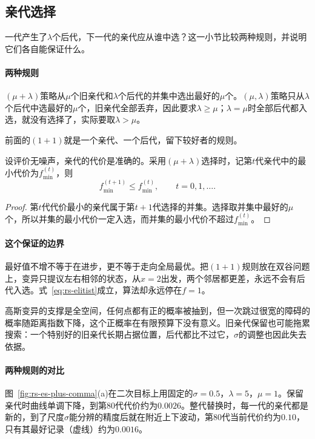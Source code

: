 \subsection{亲代选择}
\label{sec:rs-es-selection}

一代产生了$\lambda$个后代，下一代的亲代应从谁中选？这一小节比较两种规则，并说明它们各自能保证什么。

\paragraph{两种规则}
$(\mu+\lambda)$策略从$\mu$个旧亲代和$\lambda$个后代的并集中选出最好的$\mu$个。$(\mu,\lambda)$策略只从$\lambda$个后代中选最好的$\mu$个，旧亲代全部丢弃，因此要求$\lambda\geq\mu$；$\lambda=\mu$时全部后代都入选，就没有选择了，实际要取$\lambda>\mu$。

前面的$(1+1)$就是一个亲代、一个后代，留下较好者的规则。

\begin{theorem}[保留亲代时最好值不增]
\label{thm:rs-elitist}
设评价无噪声，亲代的代价是准确的。采用$(\mu+\lambda)$选择时，记第$t$代亲代中的最小代价为$f_{\min}^{(t)}$，则
\begin{equation}
 f_{\min}^{(t+1)}\leq f_{\min}^{(t)},\qquad t=0,1,\ldots.
 \label{eq:rs-elitist}
\end{equation}
\end{theorem}

\begin{proof}
第$t$代代价最小的亲代属于第$t+1$代选择的并集。选择取并集中最好的$\mu$个，所以并集的最小代价一定入选，而并集的最小代价不超过$f_{\min}^{(t)}$。
\end{proof}

\paragraph{这个保证的边界}
最好值不增不等于在进步，更不等于走向全局最优。把$(1+1)$规则放在双谷问题上，变异只提议左右相邻的状态，从$x=2$出发，两个邻居都更差，永远不会有后代入选。式~\eqref{eq:rs-elitist}成立，算法却永远停在$f=1$。

高斯变异的支撑是全空间，任何点都有正的概率被抽到，但一次跳过很宽的障碍的概率随距离指数下降，这个正概率在有限预算下没有意义。旧亲代保留也可能拖累搜索：一个特别好的旧亲代长期占据位置，后代都比不过它，$\sigma$的调整也因此失去依据。

\paragraph{两种规则的对比}
图~\ref{fig:rs-es-plus-comma}(a)在二次目标上用固定的$\sigma=0.5$，$\lambda=5$，$\mu=1$。保留亲代时曲线单调下降，到第$80$代代价约为$0.0026$。整代替换时，每一代的亲代都是新的，到了尺度$\sigma$能分辨的精度后就在附近上下波动，第$80$代当前代价约为$0.10$，只有其最好记录（虚线）约为$0.0016$。

